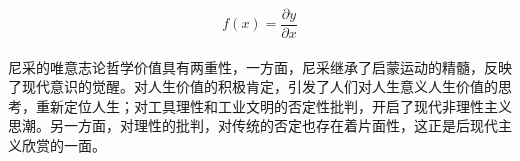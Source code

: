 \documentclass[UTF8]{ctexart}
\begin{document}
$$f(x) = \frac{\partial y}{\partial x}$$\\
尼采的唯意志论哲学价值具有两重性，一方面，尼采继承了启蒙运动的精髓，反映了现代意识的觉醒。对人生价值的积极肯定，引发了人们对人生意义人生价值的思考，重新定位人生；对工具理性和工业文明的否定性批判，开启了现代非理性主义思潮。另一方面，对理性的批判，对传统的否定也存在着片面性，这正是后现代主义欣赏的一面。
\end{document}
